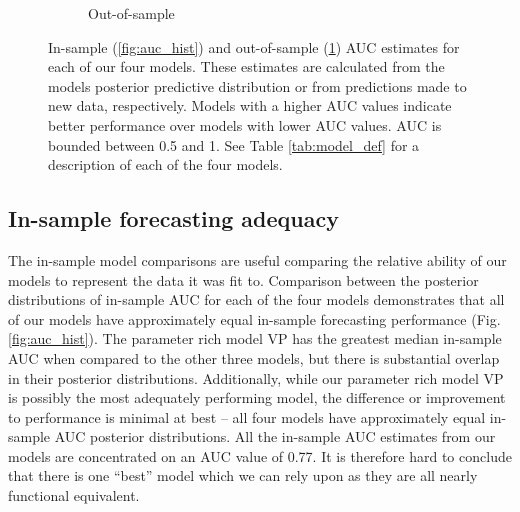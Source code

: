 \documentclass[12pt,letterpaper]{article}
\begin{document}
\begin{refsection}
\begin{figure}[ht]
\begin{subfigure}[ht]{0.45\textwidth}
  \caption{Out-of-sample}
  \label{fig:fold_auc}
 \end{subfigure}
 \caption{In-sample (\ref{fig:auc_hist}) and out-of-sample (\ref{fig:fold_auc}) AUC estimates for each of our four models. These estimates are calculated from the models posterior predictive distribution or from predictions made to new data, respectively. Models with a higher AUC values indicate better performance over models with lower AUC values. AUC is bounded between 0.5 and 1. See Table \ref{tab:model_def} for a description of each of the four models.}
 \label{fig:auc_compare}
\end{figure}

\subsection{In-sample forecasting adequacy}

The in-sample model comparisons are useful comparing the relative ability of our models to represent the data it was fit to. Comparison between the posterior distributions of in-sample AUC for each of the four models demonstrates that all of our models have approximately equal in-sample forecasting performance (Fig. \ref{fig:auc_hist}). The parameter rich model VP has the greatest median in-sample AUC when compared to the other three models, but there is substantial overlap in their posterior distributions. Additionally, while our parameter rich model VP is possibly the most adequately performing model, the difference or improvement to performance is minimal at best -- all four models have approximately equal in-sample AUC posterior distributions. All the in-sample AUC estimates from our models are concentrated on an AUC value of 0.77. It is therefore hard to conclude that there is one ``best'' model which we can rely upon as they are all nearly functional equivalent. 




\end{refsection}
\end{document}

